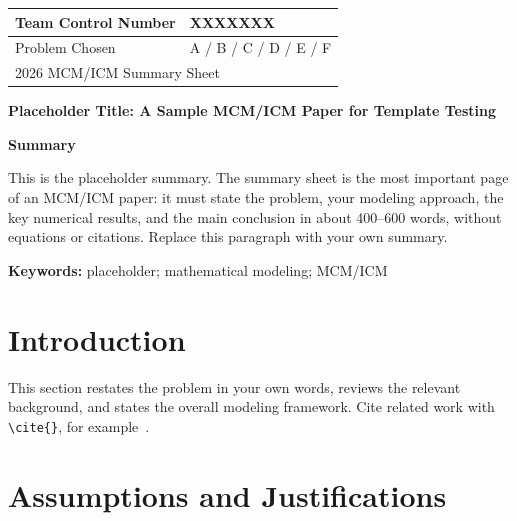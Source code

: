 \documentclass[12pt,letterpaper]{article}
\begin{document}
\thispagestyle{empty}

\noindent
\begin{tabular}{|p{}|p{}|p{}|}
\hline
\rule{0pt}{2.2em}Team Control Number & \multicolumn{2}{l|}{\rule{0pt}{2.2em}XXXXXXX} \\
\hline
\rule{0pt}{2.2em}Problem Chosen & \multicolumn{2}{l|}{\rule{0pt}{2.2em}A / B / C / D / E / F} \\
\hline
\multicolumn{3}{|l|}{\rule{0pt}{2.2em}2026 MCM/ICM Summary Sheet} \\
\hline
\end{tabular}

\vspace{1.2em}

\begin{center}
  {\large\bfseries Placeholder Title: A Sample MCM/ICM Paper for Template Testing}
\end{center}

\vspace{0.5em}
\begin{center}
  {\bfseries Summary}
\end{center}

This is the placeholder summary. The summary sheet is the most important page of an
MCM/ICM paper: it must state the problem, your modeling approach, the key numerical
results, and the main conclusion in about 400--600 words, without equations or
citations. Replace this paragraph with your own summary.

\vspace{0.6em}
\noindent\textbf{Keywords:} placeholder; mathematical modeling; MCM/ICM

\newpage

\section{Introduction}

This section restates the problem in your own words, reviews the relevant
background, and states the overall modeling framework. Cite related work with
\verb|\cite{}|, for example~\cite{smith2023mcm}.

\section{Assumptions and Justifications}
\end{document}
